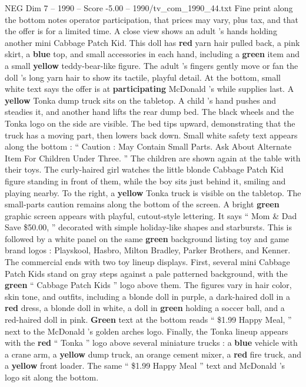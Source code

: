 \begin{textsample}{NEG Dim 7 – 1990 – Score -5.00 – 1990/tv\_com\_1990\_44.txt}
Fine print along the bottom notes operator participation, that prices may vary, plus tax, and that the offer is for a limited time.
A close view shows an adult ’s hands holding another mini Cabbage Patch Kid.
This doll has \textbf{red} yarn hair pulled back, a pink skirt, a \textbf{blue} top, and small accessories in each hand, including a \textbf{green} item and a small \textbf{yellow} teddy-bear-like figure.
The adult ’s fingers gently move or fan the doll ’s long yarn hair to show its tactile, playful detail.
At the bottom, small white text says the offer is at \textbf{participating} McDonald ’s while supplies last.
A \textbf{yellow} Tonka dump truck sits on the tabletop.
A child ’s hand pushes and steadies it, and another hand lifts the rear dump bed.
The black wheels and the Tonka logo on the side are visible.
The bed tips upward, demonstrating that the truck has a moving part, then lowers back down.
Small white safety text appears along the bottom : “ Caution : May Contain Small Parts.
Ask About Alternate Item For Children Under Three. ” The children are shown again at the table with their toys.
The curly-haired girl watches the little blonde Cabbage Patch Kid figure standing in front of them, while the boy sits just behind it, smiling and playing nearby.
To the right, a \textbf{yellow} Tonka truck is visible on the tabletop.
The small-parts caution remains along the bottom of the screen.
A bright \textbf{green} graphic screen appears with playful, cutout-style lettering.
It says “ Mom \& Dad Save \$50.00, ” decorated with simple holiday-like shapes and starbursts.
This is followed by a white panel on the same \textbf{green} background listing toy and game brand logos : Playskool, Hasbro, Milton Bradley, Parker Brothers, and Kenner.
The commercial ends with two toy lineup displays.
First, several mini Cabbage Patch Kids stand on gray steps against a pale patterned background, with the \textbf{green} “ Cabbage Patch Kids ” logo above them.
The figures vary in hair color, skin tone, and outfits, including a blonde doll in purple, a dark-haired doll in a \textbf{red} dress, a blonde doll in white, a doll in \textbf{green} holding a soccer ball, and a red-haired doll in pink. \textbf{Green} text at the bottom reads “ \$1.99 Happy Meal, ” next to the McDonald ’s golden arches logo.
Finally, the Tonka lineup appears with the \textbf{red} “ Tonka ” logo above several miniature trucks : a \textbf{blue} vehicle with a crane arm, a \textbf{yellow} dump truck, an orange cement mixer, a \textbf{red} fire truck, and a \textbf{yellow} front loader.
The same “ \$1.99 Happy Meal ” text and McDonald ’s logo sit along the bottom.

\end{textsample}
